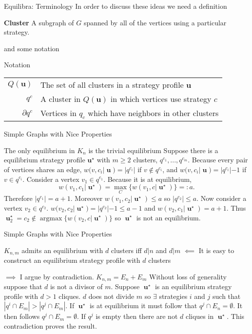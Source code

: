 \documentclass{beamer}
\DeclareMathOperator*{\argmax}{\text{argmax}}
\DeclareMathOperator{\uu}{\mathbf{u}}
\begin{document}
\begin{frame}
	{Equilibra: Terminology} %
	In order to discuss these ideas we need a definition
	\begin{block}{\textbf{Cluster}}
		A subgraph of $G$ spanned by all of the vertices using a particular strategy. 
	\end{block}  
	and some notation
	\begin{block}{Notation}
		\begin{tabular}{rp{9cm}} 
			$Q(\mathbf{u})$& The set of all clusters in a strategy profile $\mathbf{u}$ \\
			$q^c$& A cluster in $Q(\mathbf{u})$ in which vertices use strategy $c$\\
			$\partial q^c$& Vertices in $q_c$ which have neighbors in other clusters\\
		\end{tabular}
	\end{block}
\end{frame} 	
\begin{frame}{Simple Graphs with Nice Properties}
	\begin{block}{The only equilibrium in $K_n$ is the trivial equilibrium}
		Suppose there is a equilibrium strategy profile $\mathbf{u^\star}$ with $m\geq2$ clusters, $q^{c_1},...,q^{c_m}$. Because every pair of vertices shares an edge, $w(v,c_i|\uu)=|q^{c_i}|$ if $v\notin q^{c_i}$, and $w(v,c_i|\uu)=|q^{c_i}|-1$ if $v\in q^{c_i}$.  Consider a vertex $v_1\in q^{c_1}$. Because it is at equilibrium, $$w(v_1,c_1|\uu^\star)=\max_C\{w(v_1,c|\uu^\star)\}=:a.$$
		Therefore $|q^{c_1}|=a+1$. Moreover $w(v_1,c_2|\uu^\star)\leq a$ so $|q^{c_2}|\leq a$.
		Now consider a vertex  $v_2\in q^{c_2}$. $w(v_2,c_2|\uu^\star)=|q^{c_2}|-1\leq a-1$ and $w(v_2,c_1|\uu^\star)=a+1$. 
		Thus $\uu^\star_2=c_2\notin \argmax\{w(v_2,c|\uu^\star)\}$ so $\uu^\star$ is not an equilibrium.  
	\end{block}
\end{frame}

\begin{frame}{Simple Graphs with Nice Properties}
	\begin{block}{$K_{n,m}$ admits an equilibrium with $d$ clusters iff $d|n$ and $d|m$}
		$\impliedby$ It is easy to construct an equilibrium strategy profile with $d$ clusters
		
		$\implies$ I argue by contradiction. $K_{n,m}=E_n+E_m$  Without loss of generality suppose that $d$ is not a divisor of $m$. Suppose $\uu^\star$ is an equilibrium strategy profile with $d>1$ cliques. $d$ does not divide $m$ so $\exists$ strategies $i$ and $j$ such that $|q^i\cap E_m|>|q^j\cap E_m|$. If $\uu^\star$ is at equilibrium it must follow that $q^j\cap E_n=\emptyset$. It then follows $q^j\cap E_m =\emptyset$. If $q^j$ is empty then there are not $d$ cliques in $\uu^\star$. This contradiction proves the result.   
	\end{block}
\end{frame}
\end{document}

